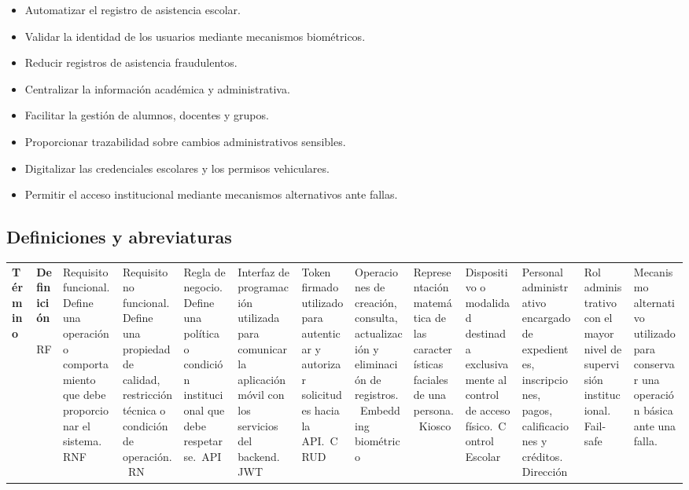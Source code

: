 \documentclass[12pt,a4paper]{article}
\begin{document}
\begin{itemize}[leftmargin=*]
\item Automatizar el registro de asistencia escolar.
\item Validar la identidad de los usuarios mediante mecanismos biométricos.
\item Reducir registros de asistencia fraudulentos.
\item Centralizar la información académica y administrativa.
\item Facilitar la gestión de alumnos, docentes y grupos.
\item Proporcionar trazabilidad sobre cambios administrativos sensibles.
\item Digitalizar las credenciales escolares y los permisos vehiculares.
\item Permitir el acceso institucional mediante mecanismos alternativos ante fallas.
\end{itemize}

\subsection{Definiciones y abreviaturas}

\begin{longtable}{p{3.5cm}p{10.5cm}}
\toprule
\textbf{Término} & \textbf{Definición}\
\midrule
RF & Requisito funcional. Define una operación o comportamiento que debe proporcionar el sistema.\
RNF & Requisito no funcional. Define una propiedad de calidad, restricción técnica o condición de operación.\
RN & Regla de negocio. Define una política o condición institucional que debe respetarse.\
API & Interfaz de programación utilizada para comunicar la aplicación móvil con los servicios del backend.\
JWT & Token firmado utilizado para autenticar y autorizar solicitudes hacia la API.\
CRUD & Operaciones de creación, consulta, actualización y eliminación de registros.\
Embedding biométrico & Representación matemática de las características faciales de una persona.\
Kiosco & Dispositivo o modalidad destinada exclusivamente al control de acceso físico.\
Control Escolar & Personal administrativo encargado de expedientes, inscripciones, pagos, calificaciones y créditos.\
Dirección & Rol administrativo con el mayor nivel de supervisión institucional.\
Fail-safe & Mecanismo alternativo utilizado para conservar una operación básica ante una falla.\
\bottomrule
\end{longtable}

\end{document}

